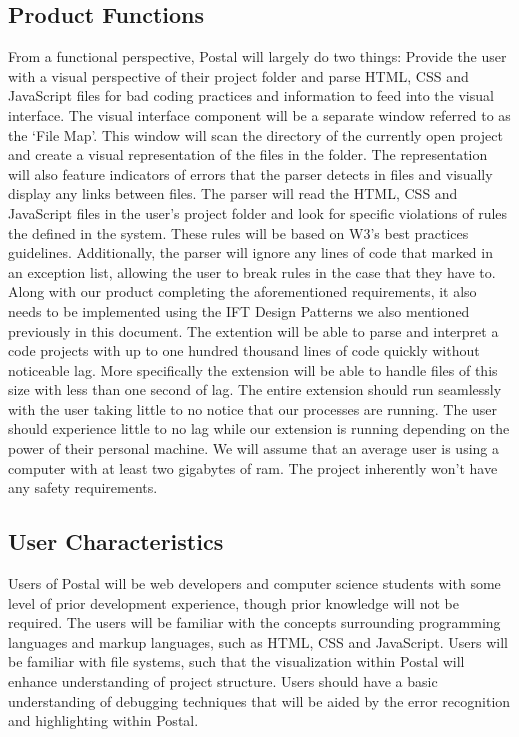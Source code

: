 \documentclass[letterpaper,10pt,titlepage,draftclsnofoot,onecolumn,onesided] {IEEEtran}
\begin{document}
\subsection{Product Functions}
From a functional perspective, Postal will largely do two things: Provide the user with a visual perspective of their project folder and parse HTML, CSS and JavaScript files for bad coding practices and information to feed into the visual interface. 
The visual interface component will be a separate window referred to as the `File Map'.
This window will scan the directory of the currently open project and create a visual representation of the files in the folder.
The representation will also feature indicators of errors that the parser detects in files and visually display any links between files.
The parser will read the HTML, CSS and JavaScript files in the user's project folder and look for specific violations of rules the defined in the system.
These rules will be based on W3's best practices guidelines.
Additionally, the parser will ignore any lines of code that marked in an exception list, allowing the user to break rules in the case that they have to.
Along with our product completing the aforementioned requirements, it also needs to be implemented using the IFT Design Patterns we also mentioned previously in this document.
The extention will be able to parse and interpret a code projects with up to one hundred thousand lines of code quickly without noticeable lag. 
More specifically the extension will be able to handle files of this size with less than one second of lag.
The entire extension should run seamlessly with the user taking little to no notice that our processes are running. 
The user should experience little to no lag while our extension is running depending on the power of their personal machine.
We will assume that an average user is using a computer with at least two gigabytes of ram. 
The project inherently won't have any safety requirements. 

\subsection{User Characteristics}
Users of Postal will be web developers and computer science students with some level of prior development experience, though prior knowledge will not be required. 
The users will be familiar with the concepts surrounding programming languages and markup languages, such as HTML, CSS and JavaScript. 
Users will be familiar with file systems, such that the visualization within Postal will enhance understanding of project structure. 
Users should have a basic understanding of debugging techniques that will be aided by the error recognition and highlighting within Postal.
\end{document}
